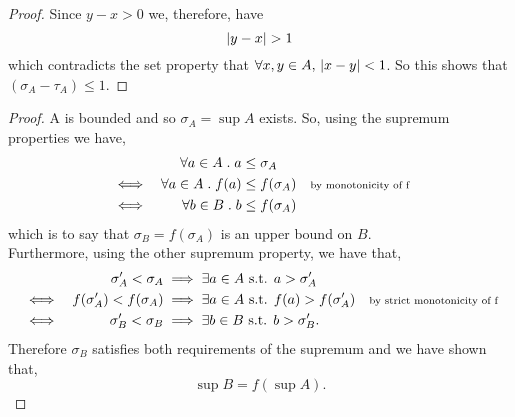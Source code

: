 \documentclass[../MathsNotesBase.tex]{subfiles}
\begin{document}
{\begin{proof}
			Since ${ y - x > 0 }$ we, therefore, have
			\[ \left\lvert y - x\right\rvert > 1 \]
			which contradicts the set property that $ \forall x,y \in A, \, \left\lvert x - y\right\rvert < 1 $. So this shows that $ (\sigma_A - \tau_A) \leq 1 $.
		\end{proof}
		
		
		\bigskip
		\begin{proof}
			A is bounded and so ${ \sigma_A = \sup A }$ exists. So, using the supremum properties we have,
			\begin{align*}
				&& \forall a \in A \;.\; a &\leq \sigma_A  \\
				&\iff & \forall a \in A \;.\; f(a)  &\leq f(\sigma_A)  &\text{\scriptsize{by monotonicity of f}}\\
				&\iff & \forall b \in B \;.\; b  &\leq f(\sigma_A) 
			\end{align*}
			which is to say that $\sigma_B = f(\sigma_A)$ is an upper bound on $B$.\\
			Furthermore, using the other supremum property, we have that,
			\begin{align*}
				&& \sigma_A' < \sigma_A &\implies \exists a \in A \text{ s.t. } a > \sigma_A' \\
				&\iff & f(\sigma_A') < f(\sigma_A)  &\implies \exists a \in A \text{ s.t. } f(a) > f(\sigma_A')  &\text{\scriptsize{by strict monotonicity of f}}\\
				&\iff & \sigma_B' < \sigma_B  &\implies \exists b \in B \text{ s.t. } b > \sigma_B'.	
			\end{align*}
			Therefore $\sigma_B$ satisfies both requirements of the supremum and we have shown that,
			\[ \sup B = f(\sup A). \]
		\end{proof}
		
		
		
		\nl[12]
		\label{ssssection:bounded-subsets-of-Rm}
		\nl[2]
		\bigskip
		\label{def:bounded-subset-of-euclidean-m-space}
		
}
\end{document}
